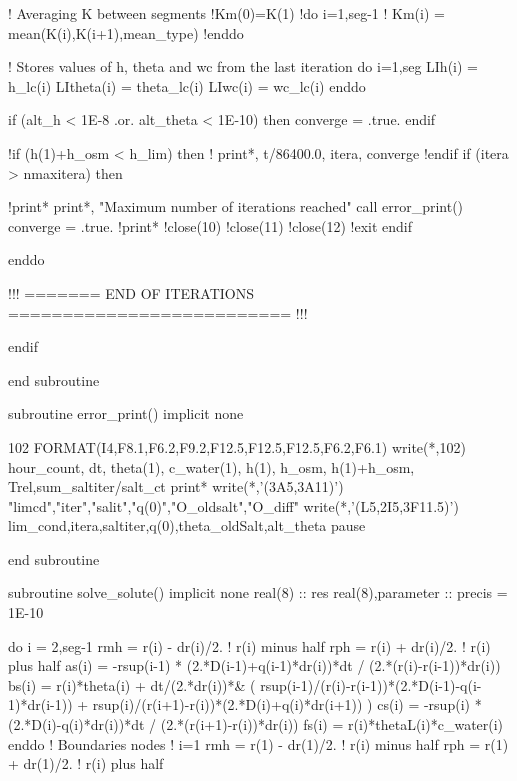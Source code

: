       ! Averaging K between segments
      !Km(0)=K(1)
      !do i=1,seg-1
      !  Km(i) = mean(K(i),K(i+1),mean_type)
      !enddo
    
      ! Stores values of h, theta and wc from the last iteration
      do i=1,seg
        LIh(i) = h_lc(i)
        LItheta(i) = theta_lc(i)
        LIwc(i) = wc_lc(i)
      enddo
      
      if (alt_h < 1E-8 .or. alt_theta < 1E-10) then
        converge = .true.
      endif

      !if (h(1)+h_osm < h_lim) then
      !  print*, t/86400.0, itera, converge
      !endif
      if (itera > nmaxitera) then

        !print*
        print*, "Maximum number of iterations reached"
	call error_print()
	converge = .true.
        !print*
        !close(10)
        !close(11)
        !close(12)
        !exit
      endif

    enddo

    !!! ======= END OF ITERATIONS ========================== !!!

  endif

end subroutine

subroutine error_print()
implicit none
  
  102 FORMAT(I4,F8.1,F6.2,F9.2,F12.5,F12.5,F12.5,F6.2,F6.1)
  write(*,102) hour_count, dt, theta(1), c_water(1), h(1), h_osm, h(1)+h_osm, Trel,sum_saltiter/salt_ct
  print*
  write(*,'(3A5,3A11)') "limcd","iter","salit","q(0)","O_oldsalt","O_diff"
  write(*,'(L5,2I5,3F11.5)') lim_cond,itera,saltiter,q(0),theta_oldSalt,alt_theta
  pause

end subroutine

subroutine solve_solute()
implicit none
real(8) :: res
real(8),parameter :: precis = 1E-10
  
  do i = 2,seg-1
    rmh = r(i) - dr(i)/2.	! r(i) minus half
    rph = r(i) + dr(i)/2.	! r(i) plus half
    as(i) = -rsup(i-1) * (2.*D(i-1)+q(i-1)*dr(i))*dt / (2.*(r(i)-r(i-1))*dr(i))
    bs(i) = r(i)*theta(i) + dt/(2.*dr(i))*&
( rsup(i-1)/(r(i)-r(i-1))*(2.*D(i-1)-q(i-1)*dr(i-1)) + rsup(i)/(r(i+1)-r(i))*(2.*D(i)+q(i)*dr(i+1)) )
    cs(i) = -rsup(i) * (2.*D(i)-q(i)*dr(i))*dt / (2.*(r(i+1)-r(i))*dr(i))
    fs(i) = r(i)*thetaL(i)*c_water(i)
  enddo
  ! Boundaries nodes
  ! i=1
  rmh = r(1) - dr(1)/2.		! r(i) minus half
  rph = r(1) + dr(1)/2.		! r(i) plus half
  
